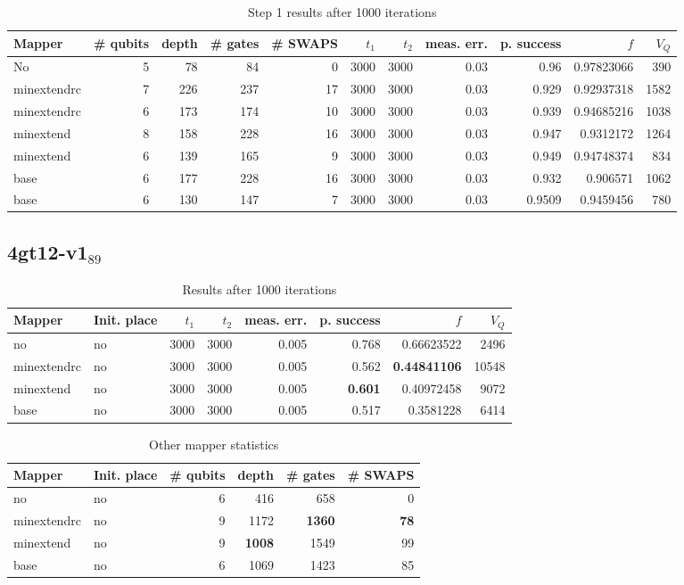 \documentclass[11pt]{article}
\begin{document}
\begin{table}[H]
\caption{\label{tab:org44dd8ee}
Step 1 results after 1000 iterations}
\centering
\begin{tabular}{lrrrrrrrrrr}
\hline
Mapper & \# qubits & depth & \# gates & \# SWAPS & \(t_1\) & \(t_2\) & meas. err. & p. success & \(f\) & \(V_Q\)\\
\hline
No & 5 & 78 & 84 & 0 & 3000 & 3000 & 0.03 & 0.96 & 0.97823066 & 390\\
\hline
minextendrc & 7 & 226 & 237 & 17 & 3000 & 3000 & 0.03 & 0.929 & 0.92937318 & 1582\\
minextendrc & 6 & 173 & 174 & 10 & 3000 & 3000 & 0.03 & 0.939 & 0.94685216 & 1038\\
minextend & 8 & 158 & 228 & 16 & 3000 & 3000 & 0.03 & 0.947 & 0.9312172 & 1264\\
minextend & 6 & 139 & 165 & 9 & 3000 & 3000 & 0.03 & 0.949 & 0.94748374 & 834\\
base & 6 & 177 & 228 & 16 & 3000 & 3000 & 0.03 & 0.932 & 0.906571 & 1062\\
base & 6 & 130 & 147 & 7 & 3000 & 3000 & 0.03 & 0.9509 & 0.9459456 & 780\\
\hline
\end{tabular}
\end{table}

\subsection{4gt12-v1\(_{\text{89}}\)}
\label{sec:org08040e6}

\begin{table}[!htpb]
\caption{\label{tab:org2a2d59f}
Results after 1000 iterations}
\centering
\begin{tabular}{llrrrrrr}
\hline
Mapper & Init. place & \(t_1\) & \(t_2\) & meas. err. & p. success & \(f\) & \(V_Q\)\\
\hline
no & no & 3000 & 3000 & 0.005 & 0.768 & 0.66623522 & 2496\\
\hline
minextendrc & no & 3000 & 3000 & 0.005 & 0.562 & \textbf{0.44841106} & 10548\\
minextend & no & 3000 & 3000 & 0.005 & \textbf{0.601} & 0.40972458 & 9072\\
base & no & 3000 & 3000 & 0.005 & 0.517 & 0.3581228 & 6414\\
\hline
\end{tabular}
\end{table}

\begin{table}[!htpb]
\caption{\label{tab:orga8010ac}
Other mapper statistics}
\centering
\small
\begin{tabular}{llrrrr}
\hline
Mapper & Init. place & \# qubits & depth & \# gates & \# SWAPS\\
\hline
no & no & 6 & 416 & 658 & 0\\
\hline
minextendrc & no & 9 & 1172 & \textbf{1360} & \textbf{78}\\
minextend & no & 9 & \textbf{1008} & 1549 & 99\\
base & no & 6 & 1069 & 1423 & 85\\
\hline
\end{tabular}
\end{table}
\end{document}
